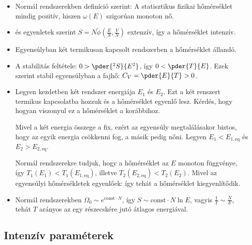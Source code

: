    \begin{itemize}
    \item 
     Normál rendszerekben definíció szerint:
     A statisztikus fizikai hőmérséklet mindig pozitív, hiszen $\omega(E)$ szigorúan monoton nő. 
    
    \item
      és  egyenletek szerint $S=N\tilde{\phi}\left(\frac{E}{N},\frac{V}{N}\right)$ extenzív, így 
     a hőmérséklet intenzív. 
     
    \item
     Egyensúlyban két termikusan kapcsolt rendszerben a hőmérséklet állandó.
    \item 
     A stabilitás feltétele: $0>\pder{^2S}{E^2}$, így $0<\pder{T}{E}$.
   Ezek szerint stabil egyensúlyban a fajhő: $C_V=\pder{E}{T}>0$. 
     
    \item 
     
     Legyen kezdetben két rendszer energiája $E_1$ és $E_2$.
   Ezt a két renszert termikus kapcsolatba hozzuk és a hőmérséklet egyenlő lesz.
   Kérdés, hogy hogyan viszonyul ez a hőmérséklet a korábbihoz. 
     
     Mivel a két energia összege a fix, ezért az egyensúly megtalálásakor biztos, hogy az egyik energia csökkenni fog, a másik pedig nőni.
   Legyen $E_1<E_{1,\text{eq}}$ és $E_2>E_{2,\text{eq}}$.
     
     Normál rendszerekre tudjuk, hogy a hőmérséklet az $E$ monoton függvénye, így $T_1(E_1)<T_1(E_{1,\text{eq}})$, illetve $T_2(E_{2,\text{eq}})<T_2(E_2)$.
   Mivel az egyensúlyi hőmérsékletek egyenlőek: 
     így tehát a hőmérséklet kiegyenlítődik.
     
    \item
     Normál rendszerekben $\Omega_0\sim e^{\text{const}\cdot N}$, így $S\sim\text{const} \cdot N \ln E$, vagyis $\frac{1}{T}\sim\frac{N}{E}$, tehát $T$ arányos az egy részecskére jutó átlagos energiával.
   \end{itemize}
   
  \subsection{Intenzív paraméterek}
   
